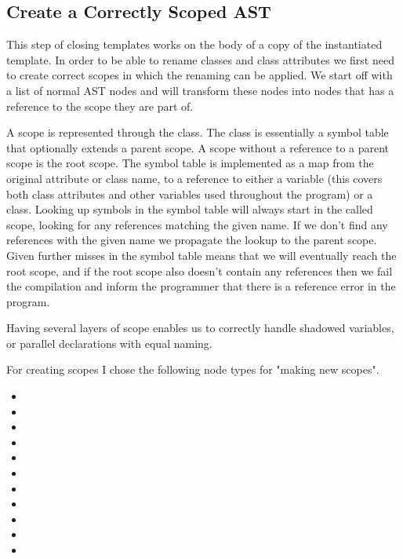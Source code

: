 \subsection{Create a Correctly Scoped AST}\label{subsec:inst-scoping}

This step of closing templates works on the body of a copy of the instantiated template.
In order to be able to rename classes and class attributes we first need to create correct scopes in which the renaming can be applied.
We start off with a list of normal AST nodes and will transform these nodes into nodes that has a reference to the scope they are part of.

A scope is represented through the  class.
The  class is essentially a symbol table that optionally extends a parent scope.
A scope without a reference to a parent scope is the root scope.
The symbol table is implemented as a map from the original attribute or class name, to a reference to either a variable (this covers both class attributes and other variables used throughout the program) or a class.
Looking up symbols in the symbol table will always start in the called scope, looking for any references matching the given name.
If we don't find any references with the given name we propagate the lookup to the parent scope.
Given further misses in the symbol table means that we will eventually reach the root scope, and if the root scope also doesn't contain any references then we fail the compilation and inform the programmer that there is a reference error in the program.

Having several layers of scope enables us to correctly handle shadowed variables, or parallel declarations with equal naming.

For creating scopes I chose the following node types for "making new scopes".

\begin{multicols}{2}
\begin{itemize}
    \item {}
    \item {}
    \item {}
    \item {}
    \item {}
    \item {}
    \item {}
    \item {}
    \item {}
    \item {}
    \item {}
\end{itemize}
\end{multicols}

